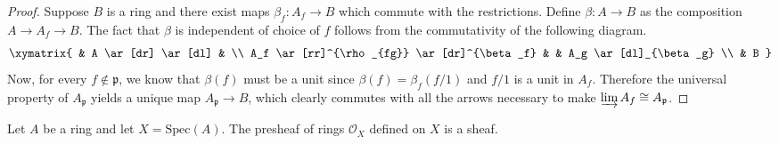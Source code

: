 \begin{proof}
Suppose $ B$ is a ring and there exist maps $ \beta_f : A_f \to
B$ which commute with the restrictions. Define $ \beta : A \to
B$ as the composition $ A \to A_f \to B$. The fact that $ \beta$
is independent of choice of $ f$ follows from the commutativity
of the following diagram.
\[ \xymatrix{
& A \ar[dr] \ar[dl] & \\
A_f \ar[rr]^{\rho_{fg}} \ar[dr]^{\beta_f} & & A_g
\ar[dl]_{\beta_g} \\
& B
} \]
Now, for every $ f \notin \mathfrak{p}$, we know that $
\beta(f)$ must be a unit since $ \beta(f) = \beta_f(f/1)$ and $
f/1$ is a unit in $ A_f$. Therefore the universal property of $
A_\mathfrak{p}$ yields a unique map $ A_{\mathfrak{p}} \to B$,
which clearly commutes with all the arrows necessary to make $
\varinjlim A_f \cong A_\mathfrak{p}$.
\end{proof}


\begin{proposition}
Let $ A$ be a ring and let $ X = \mathrm{Spec}(A)$. The presheaf
of rings $ \mathcal{O}_X$ defined on $ X$ is a sheaf.
\end{proposition}

